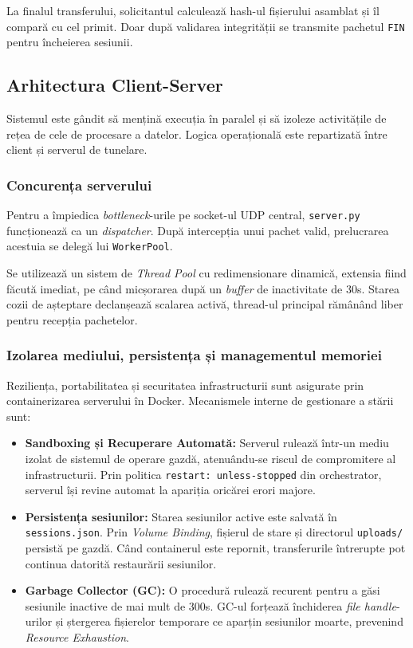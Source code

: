 La finalul transferului, solicitantul calculează hash-ul fișierului asamblat și îl compară cu cel primit. Doar după validarea integrității se transmite pachetul \texttt{FIN} pentru încheierea sesiunii.

\subsection{Arhitectura Client-Server}
Sistemul este gândit să mențină execuția în paralel și să izoleze activitățile de rețea de cele de procesare a datelor. Logica operațională este repartizată între client și serverul de tunelare.

\subsubsection{Concurența serverului}
Pentru a împiedica \textit{bottleneck}-urile pe socket-ul UDP central, \texttt{server.py} funcționează ca un \textit{dispatcher}. După intercepția unui pachet valid, prelucrarea acestuia se delegă lui \texttt{WorkerPool}.

Se utilizează un sistem de \textit{Thread Pool} cu redimensionare dinamică, extensia fiind făcută imediat, pe când micșorarea după un \textit{buffer} de inactivitate de 30s. Starea cozii de așteptare declanșează scalarea activă, thread-ul principal rămânând liber pentru recepția pachetelor.

\subsubsection{Izolarea mediului, persistența și managementul memoriei}
Reziliența, portabilitatea și securitatea infrastructurii sunt asigurate prin containerizarea serverului în Docker. Mecanismele interne de gestionare a stării sunt:

\begin{itemize}
    \item \textbf{Sandboxing și Recuperare Automată:} Serverul rulează într-un mediu izolat de sistemul de operare gazdă, atenuându-se riscul de compromitere al infrastructurii. Prin politica \texttt{restart: unless-stopped} din orchestrator, serverul își revine automat la apariția oricărei erori majore.
    \item \textbf{Persistența sesiunilor:} Starea sesiunilor active este salvată în \texttt{sessions.json}. Prin \textit{Volume Binding}, fișierul de stare și directorul \texttt{uploads/} persistă pe gazdă. Când containerul este repornit, transferurile întrerupte pot continua datorită restaurării sesiunilor.
    \item \textbf{Garbage Collector (GC):} O procedură rulează recurent pentru a găsi sesiunile inactive de mai mult de 300s. GC-ul forțează închiderea \textit{file handle}-urilor și ștergerea fișierelor temporare ce aparțin sesiunilor moarte, prevenind \textit{Resource Exhaustion}.
\end{itemize}

